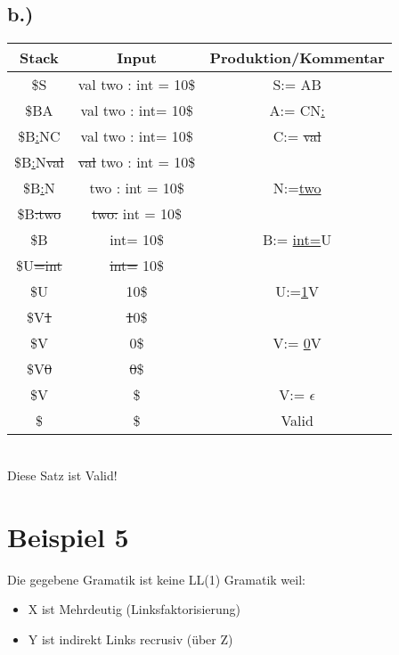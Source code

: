 \documentclass[12pt,runningheads,a4paper]{llncs}
\begin{document}
 \subsection*{b.)}
\begin{tabular}{ |c|c|c|  }

 \hline
 Stack&Input &Produktion/Kommentar\\ 
 \hline
 \$S &val two : int = 10\$ &S:= AB \\
  \hline
 \$BA &val two : int= 10\$ &A:= CN\underline{:}\\
 \hline
 \$B\underline{:}NC &val two : int= 10\$ &C:= \st{val}\\
 \hline
 \$B\underline{:}N\st{val} &\st{val} two : int = 10\$ &\\
   \hline
 \$B\underline{:}N &two : int = 10\$ &N:=\underline{two} \\
   \hline
 \$B\st{:}\st{two} &\st{two}\st{:} int = 10\$ & \\
   \hline
 \$B &int= 10\$ & B:= \underline{int}\underline{=}U \\
   \hline
 \$U\st{=}\st{int} &\st{int}\st{=} 10\$ & \\
   \hline
 \$U  &10\$ & U:=\underline{1}V \\
   \hline
 \$V\st{1} &\st{1}0\$ &\\
   \hline
 \$V &0\$ &V:= \underline{0}V\\
   \hline
 \$V\st{0}  &\st{0}\$ & \\
   \hline
 \$V  &\$  &V:= $\epsilon$\\
   \hline
 \$ &\$ &Valid \\
 \hline

 \end{tabular}\\
Diese Satz ist Valid!
\\

\newpage
\section*{Beispiel 5}
Die gegebene Gramatik ist keine LL(1) Gramatik weil:
\begin{itemize}
\item X ist Mehrdeutig (Linksfaktorisierung)
\item Y ist indirekt Links recrusiv (über Z)
\end{itemize}
\end{document}
